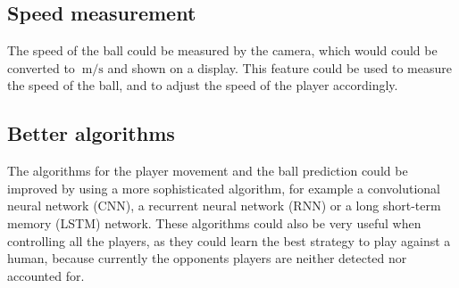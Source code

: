 \subsection*{Speed measurement}
The speed of the ball could be measured by the camera, which would could be converted to $\qty[per-mode=symbol]{}{\m\per\s}$ and shown on a display.
This feature could be used to measure the speed of the ball, and to adjust the speed of the player accordingly.
\subsection*{Better algorithms}
The algorithms for the player movement and the ball prediction could be improved by using a more sophisticated algorithm, for example a convolutional neural network (CNN)\autocite{cnn}, a recurrent neural network (RNN)\autocite{rnn} or a long short-term memory (LSTM)\autocite{lstm} network.
These algorithms could also be very useful when controlling all the players, as they could learn the best strategy to play against a human, because currently the opponents players are neither detected nor accounted for.

